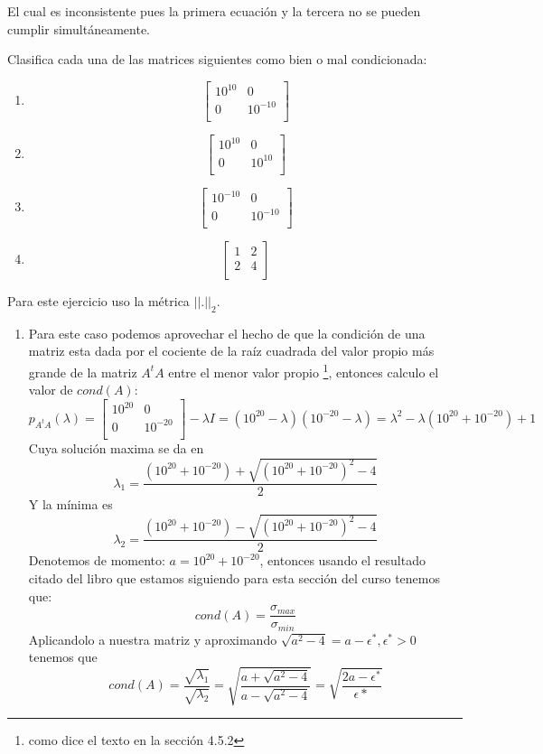 \documentclass[paper=letter, fontsize=11pt]{scrartcl}
\numberwithin{equation}{section} %
\numberwithin{figure}{section} %
\numberwithin{table}{section} %
\newenvironment{cframed}[1][blue]
  {\begin{tcolorbox}[colframe=#1,colback=white]}
  {\end{tcolorbox}}
\begin{document}
\begin{enumerate}
El cual es inconsistente pues la primera ecuación y la tercera no se pueden cumplir simultáneamente.
\begin{cframed}[teal]
\item Clasifica cada una de las matrices siguientes como bien o mal condicionada:
\begin{enumerate}
\item \[ \begin{bmatrix}
10^{10}& 0   \\
0 & 10^{-10}\\
\end{bmatrix}
\]
\item
\[ \begin{bmatrix}
10^{10}& 0   \\
0 & 10^{10}\\
\end{bmatrix}
\]
\item 
\[ \begin{bmatrix}
10^{-10}& 0   \\
0 & 10^{-10}\\
\end{bmatrix}
\]
\item \[ \begin{bmatrix}
1 & 2   \\
2 & 4\\
\end{bmatrix}
\]
\end{enumerate}
Para este ejercicio uso la métrica $||.||_2$.\\
\end{cframed}
\begin{enumerate}
\item Para este caso podemos aprovechar el hecho de que la condición de una matriz esta dada por el cociente de la raíz cuadrada del valor propio más grande de la matriz $A^tA$ entre el menor valor propio \footnote{como dice el texto en la sección 4.5.2}, entonces calculo el valor de $cond(A)$:
\[p_{A^tA}(\lambda) = 
 \begin{bmatrix}
10^{20}& 0   \\
0 & 10^{-20}\\
\end{bmatrix} -\lambda I  = (10^{20}-\lambda)(10^{-20}-\lambda) = \lambda^2 -\lambda(10^{20}+10^{-20}) +1 
\]
Cuya solución maxima se da en
\begin{equation}
\lambda_1 = \frac{(10^{20}+10^{-20}) + \sqrt{(10^{20}+10^{-20})^2-4}}{2}
\end{equation}
Y la mínima es 
\begin{equation}
\lambda_2 = \frac{(10^{20}+10^{-20}) - \sqrt{(10^{20}+10^{-20})^2-4}}{2}
\end{equation}
Denotemos de momento: $a = 10^{20}+10^{-20}$, entonces usando el resultado citado del libro que estamos siguiendo para esta sección del curso tenemos que:
\[
cond(A)= \frac{\sigma_{max}}{\sigma_{min}}
\]
Aplicandolo a nuestra matriz y aproximando $\sqrt{a^2-4} = a-\epsilon^*, \epsilon^*>0$ tenemos que 
\[
cond(A)= \frac{\sqrt{\lambda_1}}{\sqrt{\lambda_2}} = \sqrt{\frac{a+\sqrt{a^2-4}}{a-\sqrt{a^2-4}}}=\sqrt{\frac{2a-\epsilon^*}{\epsilon*}}
\]


\end{enumerate}
\end{enumerate}
\end{document}
